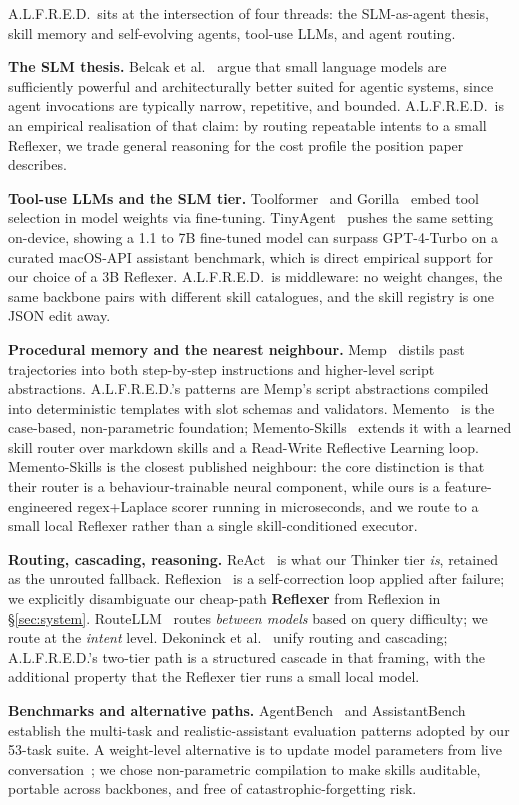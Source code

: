 A.L.F.R.E.D.\ sits at the intersection of four threads: the SLM-as-agent thesis, skill memory and self-evolving agents, tool-use LLMs, and agent routing.

\textbf{The SLM thesis.} Belcak et al.~\cite{belcak2025slm} argue that small language models are sufficiently powerful and architecturally better suited for agentic systems, since agent invocations are typically narrow, repetitive, and bounded. A.L.F.R.E.D.\ is an empirical realisation of that claim: by routing repeatable intents to a small Reflexer, we trade general reasoning for the cost profile the position paper describes.

\textbf{Tool-use LLMs and the SLM tier.} Toolformer~\cite{schick2023toolformer} and Gorilla~\cite{patil2023gorilla} embed tool selection in model weights via fine-tuning. TinyAgent~\cite{erdogan2024tinyagent} pushes the same setting on-device, showing a 1.1 to 7B fine-tuned model can surpass GPT-4-Turbo on a curated macOS-API assistant benchmark, which is direct empirical support for our choice of a 3B Reflexer. A.L.F.R.E.D.\ is middleware: no weight changes, the same backbone pairs with different skill catalogues, and the skill registry is one JSON edit away.

\textbf{Procedural memory and the nearest neighbour.} Memp~\cite{fang2025memp} distils past trajectories into both step-by-step instructions and higher-level script abstractions. A.L.F.R.E.D.'s patterns are Memp's script abstractions compiled into deterministic templates with slot schemas and validators. Memento~\cite{zhou2025memento} is the case-based, non-parametric foundation; Memento-Skills~\cite{zhou2026mementoskills} extends it with a learned skill router over markdown skills and a Read-Write Reflective Learning loop. Memento-Skills is the closest published neighbour: the core distinction is that their router is a behaviour-trainable neural component, while ours is a feature-engineered regex+Laplace scorer running in microseconds, and we route to a small local Reflexer rather than a single skill-conditioned executor.

\textbf{Routing, cascading, reasoning.} ReAct~\cite{yao2022react} is what our Thinker tier \emph{is}, retained as the unrouted fallback. Reflexion~\cite{shinn2023reflexion} is a self-correction loop applied after failure; we explicitly disambiguate our cheap-path \textbf{Reflexer} from Reflexion in \S\ref{sec:system}. RouteLLM~\cite{ong2024routellm} routes \emph{between models} based on query difficulty; we route at the \emph{intent} level. Dekoninck et al.~\cite{dekoninck2024unifiedrouting} unify routing and cascading; A.L.F.R.E.D.'s two-tier path is a structured cascade in that framing, with the additional property that the Reflexer tier runs a small local model.

\textbf{Benchmarks and alternative paths.} AgentBench~\cite{liu2023agentbench} and AssistantBench~\cite{yoran2024assistantbench} establish the multi-task and realistic-assistant evaluation patterns adopted by our 53-task suite. A weight-level alternative is to update model parameters from live conversation~\cite{wang2026openclawrl}; we chose non-parametric compilation to make skills auditable, portable across backbones, and free of catastrophic-forgetting risk.
